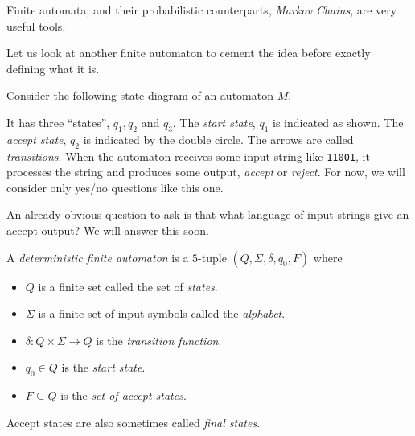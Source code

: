 Finite automata, and their probabilistic counterparts, \textit{Markov Chains}, are very useful tools.

Let us look at another finite automaton to cement the idea before exactly defining what it is.

\begin{example}
Consider the following state diagram of an automaton $M$.
\begin{center}
\end{center}
It has three ``states'', $q_1, q_2$ and $q_3$. The \textit{start state}, $q_1$ is indicated as shown. The \textit{accept state}, $q_2$ is indicated by the double circle. The arrows are called \textit{transitions}. When the automaton receives some input string like \texttt{11001}, it processes the string and produces some output, \textit{accept} or \textit{reject}. For now, we will consider only yes/no questions like this one.

An already obvious question to ask is that what language of input strings give an accept output? We will answer this soon.
\end{example}

\begin{definition}
A \textit{deterministic finite automaton} is a $5$-tuple $(Q,\Sigma, \delta, q_0, F)$ where
\begin{itemize}
    \item $Q$ is a finite set called the set of \textit{states}.
    \item $\Sigma$ is a finite set of input symbols called the \textit{alphabet}.
    \item $\delta:Q\times\Sigma\to Q$ is the \textit{transition function}.
    \item $q_0\in Q$ is the \textit{start state}.
    \item $F\subseteq Q$ is the \textit{set of accept states}.
\end{itemize}
\end{definition}

Accept states are also sometimes called \textit{final states}.

